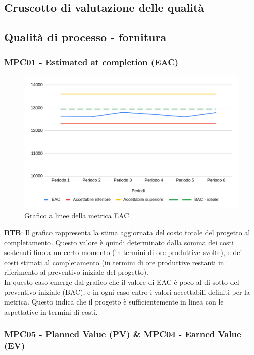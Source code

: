 \documentclass[10pt]{article}
\begin{document}
\begin{justify}
\section{Cruscotto di valutazione delle qualità}
\label{sec:cruscotto}
\subsection{Qualità di processo - fornitura}
\label{sec:QdP_fornitura}
\subsubsection{MPC01 - Estimated at completion (EAC)}

\begin{figure}[H]
  \centering
  \includegraphics[width=0.9\linewidth]{EAC.png}
  \caption{Grafico a linee della metrica EAC}
  \label{fig:EACchart}
\end{figure}


\textbf{RTB}: Il grafico rappresenta la stima aggiornata del costo totale del progetto al completamento. Questo valore è quindi determinato dalla somma 
dei costi sostenuti fino a un certo momento (in termini di ore produttive svolte), e dei costi stimati al completamento (in termini di ore produttive 
restanti in riferimento al preventivo iniziale del progetto).\\ 
In questo caso emerge dal grafico che il valore di EAC è poco al di sotto del preventivo iniziale (BAC), e in ogni caso entro i valori accettabili definiti
per la metrica. Questo indica che il progetto è sufficientemente in linea con le aspettative in termini di costi.


\subsubsection{MPC05 - Planned Value (PV) \& MPC04 - Earned Value (EV)}


\end{justify}
\end{document}
